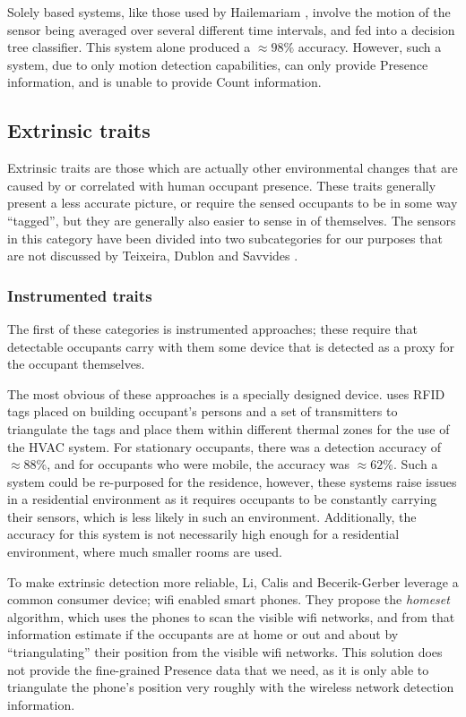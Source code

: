 \documentclass[../thesis/thesis.tex]{subfiles}
\begin{document}
Solely \pir based systems, like those used by Hailemariam \etal \cite{hailemariam2011real}, involve the motion of the sensor being averaged over several different time intervals, and fed into a decision tree classifier. This \pir system alone produced a $\approx98\%$ accuracy. However, such a system, due to only motion detection capabilities, can only provide Presence information, and is unable to provide Count information.

\subsection{Extrinsic traits}
\label{subsec:litreview:sensors:extrinsic}
Extrinsic traits are those which are actually other environmental changes that are caused by or correlated with human occupant presence. These traits generally present a less accurate picture, or require the sensed occupants to be in some way ``tagged'', but they are generally also easier to sense in of themselves. The sensors in this category have been divided into two subcategories for our purposes that are not discussed by Teixeira, Dublon and Savvides \cite{teixeira2010survey}.

\subsubsection{Instrumented traits}
\label{subsubsec:litreview:sensors:extrinsic:instrumented}
The first of these categories is instrumented approaches; these require that detectable occupants carry with them some device that is detected as a proxy for the occupant themselves.

The most obvious of these approaches is a specially designed device. \cite{li2012measuring} uses RFID tags placed on building occupant's persons and a set of transmitters to triangulate the tags and place them within different thermal zones for the use of the HVAC system. For stationary occupants, there was a detection accuracy of $\approx88\%$, and for occupants who were mobile, the accuracy was $\approx62\%$. Such a system could be re-purposed for the residence, however, these systems raise issues in a residential environment as it requires occupants to be constantly carrying their sensors, which is less likely in such an environment. Additionally, the accuracy for this system is not necessarily high enough for a residential environment, where much smaller rooms are used.

To make extrinsic detection more reliable, Li, Calis and Becerik-Gerber \cite{kleiminger2013inferring} leverage a common consumer device; wifi enabled smart phones. They propose the \textit{homeset} algorithm, which uses the phones to scan the visible wifi networks, and from that information estimate if the occupants are at home or out and about by ``triangulating'' their position from the visible wifi networks. This solution does not provide the fine-grained Presence data that we need, as it is only able to triangulate the phone's position very roughly with the wireless network detection information.
\end{document}
